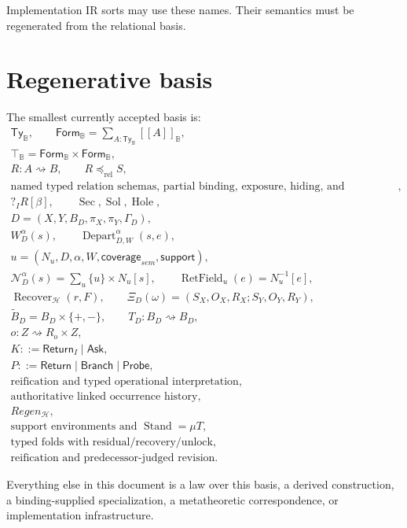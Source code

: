 \documentclass[11pt,oneside]{article}
\newcommand{\B}{\mathbb B}
\newcommand{\Depart}{\operatorname{Depart}}
\newcommand{\RetField}{\operatorname{RetField}}
\newcommand{\Stand}{\operatorname{Stand}}
\newcommand{\Recover}{\operatorname{Recover}}
\newcommand{\den}[1]{[\![#1]\!]}
\begin{document}
Implementation IR sorts may use these names.  Their semantics must be regenerated from the relational basis.

\section{Regenerative basis}

The smallest currently accepted basis is:
\[
\boxed{
\begin{gathered}
\mathsf{Ty}_{\B},
\qquad
\mathsf{Form}_{\B}=\sum_{A:\mathsf{Ty}_{\B}}\den A_{\B},\\
\top_{\B}=\mathsf{Form}_{\B}\times\mathsf{Form}_{\B},\\
R:A\rightsquigarrow B,
\qquad
R\preceq_{\mathrm{rel}}S,\\
\text{named typed relation schemas, partial binding, exposure, hiding, and composition},\\
?_IR[\beta],
\qquad
\operatorname{Sec},\operatorname{Sol},\operatorname{Hole},\\
D=(X,Y,B_D,\pi_X,\pi_Y,\Gamma_D),\\
W_D^\alpha(s),
\qquad
\Depart_{D,W}^{\alpha}(s,e),\\
u=(N_u,D,\alpha,W,\mathsf{coverage}_{sem},\mathsf{support}),\\
\mathcal N_D^\alpha(s)=\sum_u\{u\}\times N_u[s],
\qquad
\RetField_u(e)=N_u^{-1}[e],\\
\Recover_{\mathcal H}(r,F),
\qquad
\Xi_D(\omega)=(S_X,O_X,R_X;S_Y,O_Y,R_Y),\\
\widetilde B_D=B_D\times\{+,-\},
\qquad
T_D:B_D\rightsquigarrow B_D,\\
o:Z\rightsquigarrow R_o\times Z,\\
K::=\mathsf{Return}_I\mid\mathsf{Ask},\\
P::=\mathsf{Return}\mid\mathsf{Branch}\mid\mathsf{Probe},\\
\text{reification and typed operational interpretation},\\
\text{authoritative linked occurrence history},\\
Regen_{\mathcal H},\\
\text{support environments and }\Stand=\mu T,\\
\text{typed folds with residual/recovery/unlock},\\
\text{reification and predecessor-judged revision}.
\end{gathered}
}
\]

Everything else in this document is a law over this basis, a derived construction, a binding-supplied specialization, a metatheoretic correspondence, or implementation infrastructure.
\end{document}
